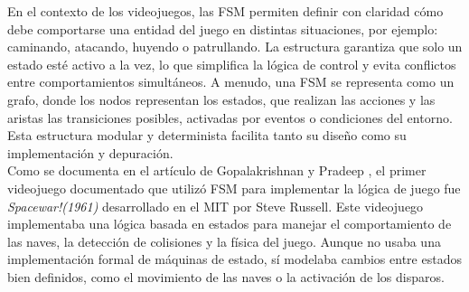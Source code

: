 En el contexto de los videojuegos, las FSM permiten definir con claridad cómo debe comportarse una entidad del juego en distintas situaciones, por ejemplo: caminando, atacando, huyendo o patrullando. La estructura garantiza que solo un estado esté activo a la vez, lo que simplifica la lógica de control y evita conflictos entre comportamientos simultáneos. 
A menudo, una FSM se representa como un grafo, donde los nodos representan los estados, que realizan las acciones y las aristas las transiciones posibles, activadas por eventos o condiciones del entorno. Esta estructura modular y determinista facilita tanto su diseño como su implementación y depuración.\\

Como se documenta en el artículo de Gopalakrishnan y Pradeep \cite{Gopalakrishnan2021}, el primer videojuego documentado que utilizó FSM para implementar la lógica de juego fue \textit{Spacewar!(1961)} desarrollado en el MIT por Steve Russell. Este videojuego implementaba una lógica basada en estados para manejar el comportamiento de las naves, la detección de colisiones y la física del juego. Aunque no usaba una implementación formal de máquinas de estado, sí modelaba cambios entre estados bien definidos, como el movimiento de las naves o la activación de los disparos. \\ 

